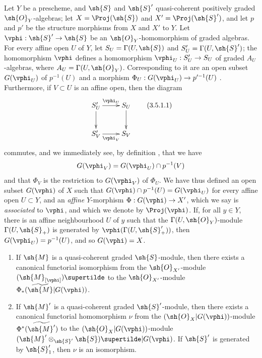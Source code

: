 \begin{env}[3.5.1]
\label{II.3.5.1}
Let $Y$ be a prescheme, and $\sh{S}$ and $\sh{S}'$ quasi-coherent positively graded $\sh{O}_Y$-algebras;
let $X=\Proj(\sh{S})$ and $X'=\Proj(\sh{S}')$, and let $p$ and $p'$ be the structure morphisms from $X$ and $X'$ to $Y$.
Let $\vphi:\sh{S}'\to\sh{S}$ be an $\sh{O}_Y$-homomorphism of graded algebras.
For every affine open $U$ of $Y$, let $S_U=\Gamma(U,\sh{S})$ and $S'_U=\Gamma(U,\sh{S}')$;
the homomorphism $\vphi$ defines a homomorphism $\vphi_U:S'_U\to S_U$ of graded $A_U$-algebras, where $A_U=\Gamma(U,\sh{O}_Y)$.
Corresponding to it are an open subset $G(\vphi_U)$ of $p^{-1}(U)$ and a morphism $\Phi_U:G(\vphi_U)\to p'^{-1}(U)$ .
Furthermore, if $V\subset U$ is an affine open, then the diagram
\[
\label{II.3.5.1.1}
  \xymatrix{
    S'_U \ar[r]^{\vphi_U} \ar[d]
    & S_U \ar[d]
  \\S'_V \ar[r]_{\vphi_V}
    & S_V
  }
\tag{3.5.1.1}
\]
commutes, and we immediately see, by definition , that we have
\[
  G(\vphi_V) = G(\vphi_U)\cap p^{-1}(V)
\]
and that $\Phi_V$ is the restriction to $G(\vphi_V)$ of $\Phi_U$.
We have thus defined an open subset $G(\vphi)$ of $X$ such that $G(\vphi)\cap p^{-1}(U)=G(\vphi_U)$ for every affine open $U\subset Y$, and an \emph{affine} $Y$-morphism $\Phi:G(\vphi)\to X'$, which we say is \emph{associated} to $\vphi$, and which we denote by $\Proj(\vphi)$.
If, for all $y\in Y$, there is an affine neighbourhood $U$ of $y$ such that the $\Gamma(U,\sh{O}_Y)$-module $\Gamma(U,\sh{S}_+)$ is generated by $\vphi(\Gamma(U,\sh{S}'_+))$, then $G(\vphi_U)=p^{-1}(U)$, and so $G(\vphi)=X$.
\end{env}

\begin{proposition}[3.5.2]
\label{II.3.5.2}
\medskip\noindent
\begin{enumerate}
  \item[(i)] If $\sh{M}$ is a quasi-coherent graded $\sh{S}$-module, then there exists a canonical functorial isomorphism from the $\sh{O}_{X'}$-module $(\sh{M}_{[\vphi]})\supertilde$ to the $\sh{O}_{X'}$-module $\Phi_*(\widetilde{\sh{M}}|G(\vphi))$.
  \item[(ii)] If $\sh{M}'$ is a quasi-coherent graded $\sh{S}'$-module, then there exists a canonical functorial homomorphism $\nu$ from the $(\sh{O}_X|G(\vphi))$-module $\Phi^*(\widetilde{\sh{M}'})$ to the $(\sh{O}_X|G(\vphi))$-module $(\sh{M}'\otimes_{\sh{S}'}\sh{S})\supertilde|G(\vphi)$.
    If $\sh{S}'$ is generated by $\sh{S}'_1$, then $\nu$ is an isomorphism.
\end{enumerate}
\end{proposition}

